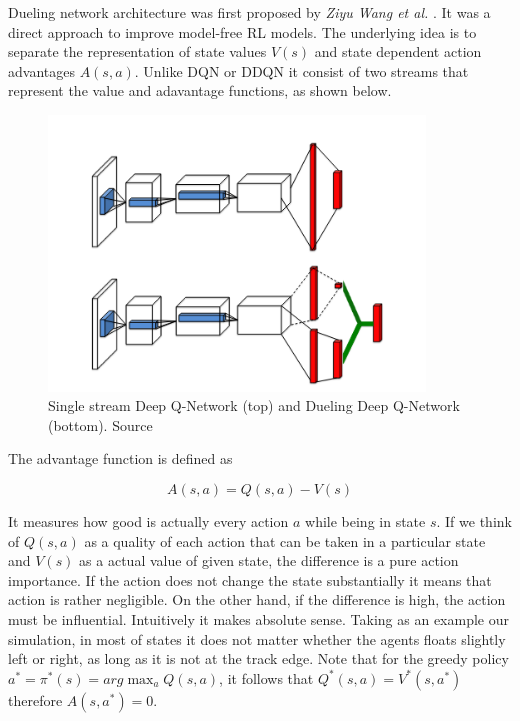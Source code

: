 Dueling network architecture was first proposed by \emph{Ziyu Wang  et al.} \cite{DBLP:journals/corr/WangFL15}. It was a direct approach to 
improve model-free RL models. The underlying idea is to separate the representation of state values $V(s)$ and state dependent action 
advantages $A(s, a)$. Unlike DQN or DDQN it consist of two streams that represent the value and adavantage functions, as shown below.

\begin{figure}[h]
    \centering
    \includegraphics[width=10cm]{img/dueling_vs_single_qn.png}
    \caption{Single stream Deep Q-Network (top) and Dueling Deep Q-Network (bottom). Source \cite{DBLP:journals/corr/WangFL15}}
    \label{fig:single-vs-dueling-q-network}
\end{figure}

The advantage function is defined as

\begin{equation}
    A(s, a) = Q(s, a) - V(s)
\label{eq:advantage}
\end{equation}

It measures how good is actually every action $a$ while being in state $s$. If we think of $Q(s, a)$ as a quality of each action that can be
taken in a particular state and $V(s)$ as a actual value of given state, the difference is a pure action importance. If the action does not 
change the state substantially it means that action is rather negligible. On the other hand, if the difference is high, the action must be
influential. Intuitively it makes absolute sense. Taking as an example our simulation, in most of states it does not matter whether the
agents floats slightly left or right, as long as it is not at the track edge. Note that for the greedy policy $a^* = \pi^*(s) =
arg\max_aQ(s, a)$, it follows that $Q^*(s, a) = V^*(s, a^*)$ therefore $A(s, a^*) = 0$.

